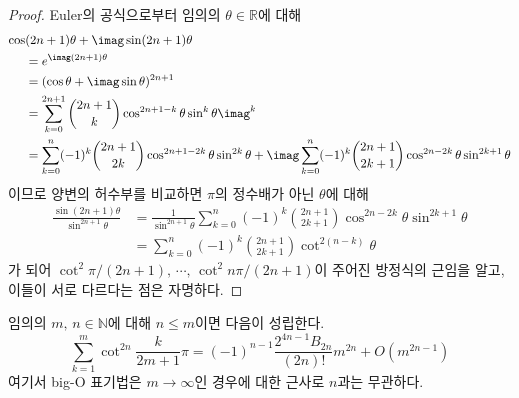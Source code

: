 \begin{proof}
    Euler의 공식으로부터 임의의 $\theta\in\mathbb{R}$에 대해
    \begin{align*}
        \cos&(2n+1)\theta+\imag\sin(2n+1)\theta\\
        &=e^{\imag(2n+1)\theta}\\
        &=(\cos\theta+\imag\sin\theta)^{2n+1}\\
        &=\sum_{k=0}^{2n+1}\binom{2n+1}{k}\cos^{2n+1-k}\theta\sin^k\theta\imag^k\\
        &=\sum_{k=0}^n(-1)^k\binom{2n+1}{2k}\cos^{2n+1-2k}\theta\sin^{2k}\theta+\imag\sum_{k=0}^n(-1)^k\binom{2n+1}{2k+1}\cos^{2n-2k}\theta\sin^{2k+1}\theta
    \end{align*}
    이므로 양변의 허수부를 비교하면 $\pi$의 정수배가 아닌 $\theta$에 대해
    \begin{align*}
        \frac{\sin(2n+1)\theta}{\sin^{2n+1}\theta}&=\frac{1}{\sin^{2n+1}\theta}\sum_{k=0}^n(-1)^k\binom{2n+1}{2k+1}\cos^{2n-2k}\theta\sin^{2k+1}\theta\\
        &=\sum_{k=0}^n(-1)^k\binom{2n+1}{2k+1}\cot^{2(n-k)}\theta
    \end{align*}
    가 되어 $\cot^2\pi/(2n+1),\,\cdots,\,\cot^2n\pi/(2n+1)$이 주어진 방정식의 근임을 알고, 이들이 서로 다르다는 점은 자명하다.
\end{proof}

\begin{lemma}
    임의의 $m,\,n\in\mathbb{N}$에 대해 $n\leq m$이면 다음이 성립한다.
    \begin{equation*}
        \sum_{k=1}^m\cot^{2n}\frac{k}{2m+1}\pi=(-1)^{n-1}\frac{2^{4n-1}B_{2n}}{(2n)!}m^{2n}+O(m^{2n-1})
    \end{equation*}
    여기서 big-O 표기법은 $m\to\infty$인 경우에 대한 근사로 $n$과는 무관하다.
\end{lemma}

